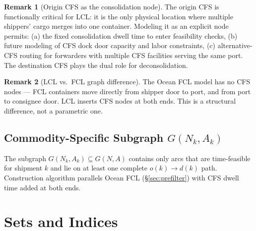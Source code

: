 \documentclass[11pt,a4paper]{article}
\theoremstyle{definition}
\newtheorem{remark}{Remark}
\begin{document}
\begin{remark}[Origin CFS as the consolidation node]
The origin CFS is functionally critical for LCL: it is the only physical location where
multiple shippers' cargo merges into one container. Modeling it as an explicit node permits:
(a) the fixed consolidation dwell time to enter feasibility checks, (b) future modeling of
CFS dock door capacity and labor constraints, (c) alternative-CFS routing for forwarders with
multiple CFS facilities serving the same port. The destination CFS plays the dual role for
deconsolidation.
\end{remark}

\begin{remark}[LCL vs.\ FCL graph difference]
The Ocean FCL model has no CFS nodes — FCL containers move directly from shipper door to
port, and from port to consignee door. LCL inserts CFS nodes at both ends. This is a
structural difference, not a parametric one.
\end{remark}

\subsection{Commodity-Specific Subgraph \texorpdfstring{$G(N_k, A_k)$}{G(Nk,Ak)}}
\label{sec:subgraph}

The subgraph $G(N_k, A_k) \subseteq G(N, A)$ contains only arcs that are time-feasible for
shipment $k$ and lie on at least one complete $o(k) \to d(k)$ path. Construction algorithm
parallels Ocean FCL (\S\ref{sec:prefilter}) with CFS dwell time added at both ends.

\section{Sets and Indices}
\end{document}
